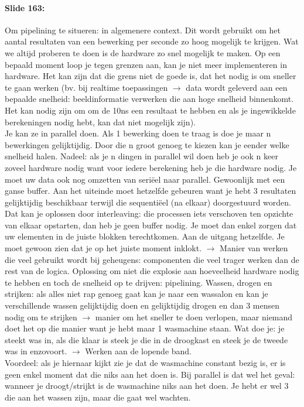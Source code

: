 \documentclass[10pt,a4paper]{book}
\begin{document}
\paragraph{Slide 163:} Om pipelining te situeren: in algemenere context. Dit wordt gebruikt om het aantal resultaten van een bewerking per seconde zo hoog mogelijk te krijgen. Wat we altijd proberen te doen is de hardware zo snel mogelijk te maken. Op een bepaald moment loop je tegen grenzen aan, kan je niet meer implementeren in hardware. Het kan zijn dat die grens niet de goede is, dat het nodig is om sneller te gaan werken (bv. bij realtime toepassingen $\rightarrow$ data wordt geleverd aan een bepaalde snelheid: beeldinformatie verwerken die aan hoge snelheid binnenkomt. Het kan nodig zijn om om de 10ns een resultaat te hebben en als je ingewikkelde berekeningen nodig hebt, kan dat niet mogelijk zijn).\\
Je kan ze in parallel doen. Als 1 bewerking doen te traag is doe je maar n bewerkingen gelijktijdig. Door die n groot genoeg te kiezen kan je eender welke snelheid halen. Nadeel: als je n dingen in parallel wil doen heb je ook n keer zoveel hardware nodig want voor iedere berekening heb je die hardware nodig. Je moet uw data ook nog omzetten van seri\"eel naar parallel. Gewoonlijk met een ganse buffer. Aan het uiteinde moet hetzelfde gebeuren want je hebt 3 resultaten gelijktijdig beschikbaar terwijl die sequenti\"eel (na elkaar) doorgestuurd worden. Dat kan je oplossen door interleaving: die processen iets verschoven ten opzichte van elkaar opstarten, dan heb je geen buffer nodig. Je moet dan enkel zorgen dat uw elementen in de juiste blokken terechtkomen. Aan de uitgang hetzelfde. Je moet gewoon zien dat je op het juiste moment inklokt. $\rightarrow$ Manier van werken die veel gebruikt wordt bij geheugens: componenten die veel trager werken dan de rest van de logica. Oplossing om niet die explosie aan hoeveelheid hardware nodig te hebben en toch de snelheid op te drijven: pipelining. Wassen, drogen en strijken: als alles niet rap genoeg gaat kan je naar een wassalon en kan je verschillende wassen gelijktijdig doen en gelijktijdig drogen en dan 3 mensen nodig om te strijken $\rightarrow$ manier om het sneller te doen verlopen, maar niemand doet het op die manier want je hebt maar 1 wasmachine staan. Wat doe je: je steekt was in, als die klaar is steek je die in de droogkast en steek je de tweede was in enzovoort. $\rightarrow$ Werken aan de lopende band.\\
Voordeel: als je hiernaar kijkt zie je dat de wasmachine constant bezig is, er is geen enkel moment dat die niks aan het doen is. Bij parallel is dat wel het geval: wanneer je droogt/strijkt is de wasmachine niks aan het doen. Je hebt er wel 3 die aan het wassen zijn, maar die gaat wel wachten.\\
\end{document}
